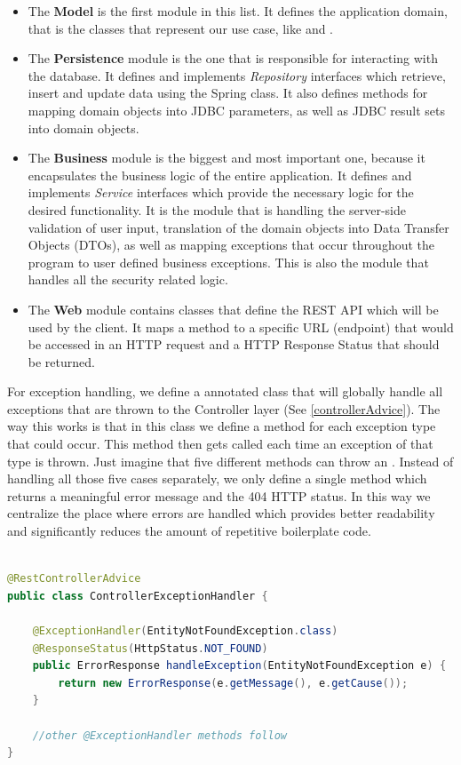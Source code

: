 \begin{itemize}
    \item The \textbf{Model} is the first module in this list. It defines the application domain, that is the classes that represent our use case, like  and .
    \item The \textbf{Persistence} module is the one that is responsible for interacting with the database. It defines and implements \textit{Repository} interfaces which retrieve, insert and update data using the Spring  class. It also defines methods for mapping domain objects into JDBC parameters, as well as JDBC result sets into domain objects.
    \item The \textbf{Business} module is the biggest and most important one, because it encapsulates the business logic of the entire application. It defines and implements \textit{Service} interfaces which provide the necessary logic for the desired functionality. It is the module that is handling the server-side validation of user input, translation of the domain objects into Data Transfer Objects (DTOs), as well as mapping exceptions that occur throughout the program to user defined business exceptions. This is also the module that handles all the security related logic.
    \item The \textbf{Web} module contains  classes that define the REST API which will be used by the client. It maps a method to a specific URL (endpoint) that would be accessed in an HTTP request and a HTTP Response Status that should be returned.
\end{itemize}

For exception handling, we define a  annotated class that will globally handle all exceptions that are thrown to the Controller layer (See \ref{controllerAdvice}). The way this works is that in this class we define a method for each exception type that could occur. This method then gets called each time an exception of that type is thrown. Just imagine that five different methods can throw an . Instead of handling all those five cases separately, we only define a single method which returns a meaningful error message and the 404 HTTP status. In this way we centralize the place where errors are handled which provides better readability and significantly reduces the amount of repetitive boilerplate code.

\begin{lstlisting}[language=Java, caption={Simplified example of global exception handling class}, label={controllerAdvice}]

@RestControllerAdvice
public class ControllerExceptionHandler {

    @ExceptionHandler(EntityNotFoundException.class)
    @ResponseStatus(HttpStatus.NOT_FOUND)
    public ErrorResponse handleException(EntityNotFoundException e) {
        return new ErrorResponse(e.getMessage(), e.getCause());
    }

    //other @ExceptionHandler methods follow
}

\end{lstlisting}

